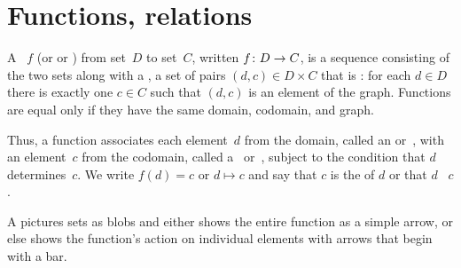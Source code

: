 \documentclass{ibl}  %
\begin{document}
\chapter{Functions, relations}
\begin{df}
A ~$f$ (or  or ) 
from  set~$D$
to  set~$C$, written $\mbox{$f\colon D\to C$}$,
is a sequence consisting of the two sets along with a , 
a set of pairs $(d,c)\in D\times C$ that is 
: for each $d\in D$ there is
exactly one $c\in C$ such that $(d,c)$ is an element of the graph. 
Functions are equal only if they have the same domain, codomain,
and graph.
\end{df}

\noindent Thus, a function associates each element~$d$ from the domain,
called an  or~,
with an element~$c$ from the codomain, 
called a~ or~,
subject to the condition that $d$ determines~$c$. 
We write $f(d)=c$ or $d\mapsto c$ 
and say that $c$ is the  of $d$ 
or that $d$ ~$c$.

A  pictures sets as blobs and 
either shows the entire function as a simple arrow,   
or else shows the function's action on individual elements 
with arrows that begin with a bar.
\begin{center}
  \hspace{8em}
\end{center}
\end{document}
